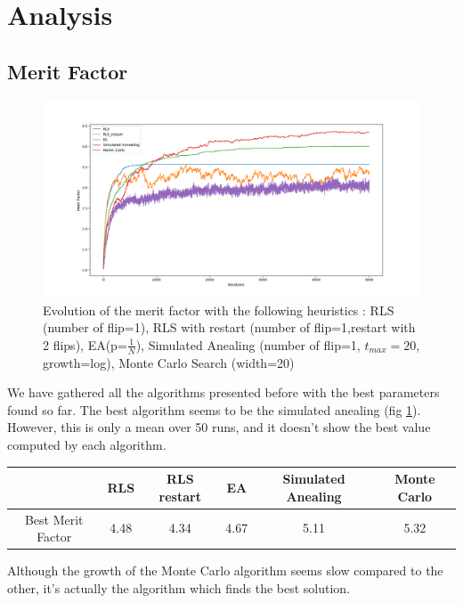 \documentclass[a4paper,11pt,openany]{article}
\begin{document}
\section{Analysis}
\subsection{Merit Factor}
\begin{figure}[H]
\begin{center}
\includegraphics[scale=0.35]{Images/all_results}
\caption{Evolution of the merit factor with the following heuristics : RLS (number of flip=1), RLS with restart (number of flip=1,restart with 2 flips), EA(p=$\frac{1}{N}$), Simulated Anealing (number of flip=1, $t_{max}=20$, growth=log), Monte Carlo Search (width=20)}
\label{fig:all_results}
\end{center}
\end{figure}
\noindent
We have gathered all the algorithms presented before with the best parameters found so far. The best algorithm seems to be the simulated anealing (fig \ref{fig:all_results}). However, this is only a mean over 50 runs, and it doesn't show the best value computed by each algorithm.\\
\begin{center}
\begin{tabular}{|c|c|c|c|c|c|}
\hline
  & RLS & RLS restart & EA & Simulated Anealing & Monte Carlo \\
\hline
Best Merit Factor & 4.48 & 4.34 & 4.67 & 5.11 & 5.32\\
\hline
\end{tabular}
\end{center}
Although the growth of the Monte Carlo algorithm seems slow compared to the other, it's actually the algorithm which finds the best solution.
\end{document}
